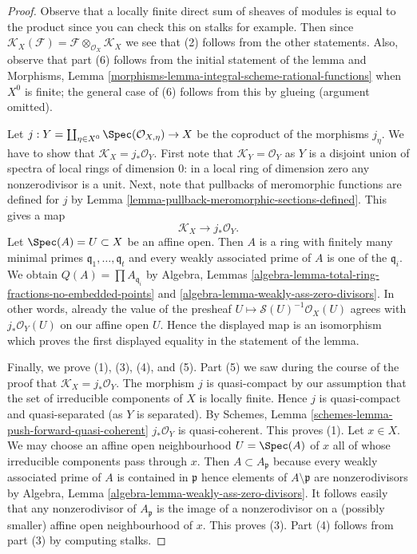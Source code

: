 \begin{proof}
Observe that a locally finite direct sum of sheaves of modules
is equal to the product since you can check this on stalks for
example. Then since $\mathcal{K}_X(\mathcal{F}) =
\mathcal{F} \otimes_{\mathcal{O}_X} \mathcal{K}_X$
we see that (2) follows from the other statements.
Also, observe that part (6) follows from the initial
statement of the lemma and Morphisms, Lemma
\ref{morphisms-lemma-integral-scheme-rational-functions}
when $X^0$ is finite; the general case of (6) follows from this
by glueing (argument omitted).

\medskip\noindent
Let $j : Y = \coprod\nolimits_{\eta \in X^0} \Spec(\mathcal{O}_{X, \eta}) \to X$
be the coproduct of the morphisms $j_\eta$. We have to show that
$\mathcal{K}_X = j_*\mathcal{O}_Y$.
First note that $\mathcal{K}_Y = \mathcal{O}_Y$ as $Y$ is a disjoint
union of spectra of local rings of dimension $0$: in a local
ring of dimension zero any nonzerodivisor is a unit.
Next, note that pullbacks of meromorphic
functions are defined for $j$ by
Lemma \ref{lemma-pullback-meromorphic-sections-defined}.
This gives a map
$$
\mathcal{K}_X \longrightarrow j_*\mathcal{O}_Y.
$$
Let $\Spec(A) = U \subset X$ be an affine open. Then $A$ is a ring
with finitely many minimal primes $\mathfrak q_1, \ldots, \mathfrak q_t$
and every weakly associated prime of $A$ is one of the $\mathfrak q_i$.
We obtain $Q(A) = \prod A_{\mathfrak q_i}$
by Algebra, Lemmas \ref{algebra-lemma-total-ring-fractions-no-embedded-points}
and \ref{algebra-lemma-weakly-ass-zero-divisors}.
In other words, already the value of the presheaf
$U \mapsto \mathcal{S}(U)^{-1}\mathcal{O}_X(U)$ agrees with
$j_*\mathcal{O}_Y(U)$ on our affine open $U$. Hence the displayed
map is an isomorphism which proves the first displayed equality in
the statement of the lemma.

\medskip\noindent
Finally, we prove (1), (3), (4), and (5).
Part (5) we saw during the course of the proof that
$\mathcal{K}_X = j_*\mathcal{O}_Y$.
The morphism $j$ is quasi-compact by our assumption
that the set of irreducible components of $X$ is locally finite.
Hence $j$ is quasi-compact and quasi-separated (as $Y$ is separated).
By Schemes, Lemma \ref{schemes-lemma-push-forward-quasi-coherent}
$j_*\mathcal{O}_Y$ is quasi-coherent. This proves (1).
Let $x \in X$. We may choose an affine open neighbourhood
$U = \Spec(A)$ of $x$ all of whose irreducible components
pass through $x$. Then $A \subset A_\mathfrak p$ because every
weakly associated prime of $A$ is contained in $\mathfrak p$
hence elements of $A \setminus \mathfrak p$ are nonzerodivisors
by Algebra, Lemma \ref{algebra-lemma-weakly-ass-zero-divisors}.
It follows easily that any nonzerodivisor of $A_\mathfrak p$
is the image of a nonzerodivisor on a (possibly smaller)
affine open neighbourhood of $x$. This proves (3).
Part (4) follows from part (3) by computing stalks.
\end{proof}

